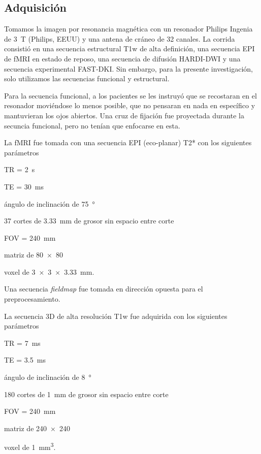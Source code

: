 \subsection{Adquisición}
Tomamos la imagen por resonancia magnética con un resonador Philips Ingenia de \SI{3}{\tesla} (Philips, EEUU) y una antena de cráneo de 32 canales. La corrida consistió en una secuencia estructural T1w de alta definición, una secuencia EPI de fMRI en estado de reposo, una secuencia de difusión HARDI-DWI y una secuencia experimental FAST-DKI. Sin embargo, para la presente investigación, solo utilizamos las secuencias funcional y estructural.\par
Para la secuencia funcional, a los pacientes se les instruyó que se recostaran en el resonador moviéndose lo menos posible, que no pensaran en nada en específico y mantuvieran los ojos abiertos. Una cruz de fijación fue proyectada durante la secuncia funcional, pero no tenían que enfocarse en esta. \par
La fMRI fue tomada con una secuencia EPI (eco-planar) T2* con los siguientes parámetros
\begin{enumerate*}[label=\emph{\alph*}), before=\unskip{: }, itemjoin={{; }}, itemjoin*={{, y }}]
    \item TR = \SI{2}{\second}
    \item TE = \SI{30}{\milli\second}
    \item ángulo de inclinación de \SI{75}{\degree}
    \item 37 cortes de \SI{3.33}{\milli\meter} de grosor sin espacio entre corte
    \item FOV = \SI{240}{\milli\meter}
    \item matriz de \num{80x80}
    \item voxel de \SI[product-units=single]{3x3x3.33}{\milli\meter}.
\end{enumerate*}
Una secuencia \textit{fieldmap} fue tomada en dirección opuesta para el preprocesamiento.\par
La secuencia 3D de alta resolución T1w fue adquirida con los siguientes parámetros
\begin{enumerate*}[label=\emph{\alph*}), before=\unskip{: }, itemjoin={{; }}, itemjoin*={{, y }}]
    \item TR = \SI{7}{\milli\second}
    \item TE = \SI{3.5}{\milli\second}
    \item ángulo de inclinación de \SI{8}{\degree}
    \item 180 cortes de \SI{1}{\milli\meter} de grosor sin espacio entre corte
    \item FOV = \SI{240}{\milli\meter}
    \item matriz de \num{240x240}
    \item voxel de \SI[product-units=single]{1}{\milli\meter\cubed}.
\end{enumerate*}

